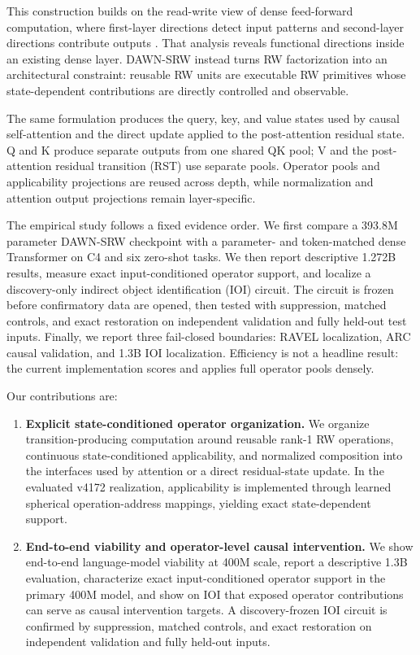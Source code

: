 \documentclass{article}
\newcommand{\DAWN}{DAWN-SRW}
\begin{document}
This construction builds on the read-write view of dense feed-forward
computation, where first-layer directions detect input patterns and second-layer
directions contribute outputs \cite{geva2021transformer}. That analysis reveals
functional directions inside an existing dense layer. \DAWN{} instead turns RW
factorization into an architectural constraint: reusable RW units are
executable RW primitives whose state-dependent contributions are
directly controlled and observable.

The same formulation produces the query, key, and value states used by causal
self-attention and the direct update applied to the post-attention residual
state.
Q and K produce separate outputs from one shared QK pool; V and the
post-attention residual transition (RST) use separate pools. Operator pools and
applicability projections are reused across depth, while normalization and
attention output projections remain layer-specific.

The empirical study follows a fixed evidence order. We first compare a 393.8M
parameter \DAWN{} checkpoint with a parameter- and token-matched dense
Transformer on C4 and six zero-shot tasks. We then report descriptive 1.272B
results, measure exact input-conditioned operator support, and localize a
discovery-only indirect object identification (IOI) circuit. The circuit is
frozen before confirmatory data are opened, then tested with suppression,
matched controls, and exact restoration on independent validation and fully
held-out test inputs. Finally, we report three fail-closed boundaries: RAVEL
localization, ARC causal validation, and 1.3B IOI localization. Efficiency is
not a headline result: the current implementation scores and applies full
operator pools densely.

Our contributions are:
\begin{enumerate}
    \item \textbf{Explicit state-conditioned operator organization.} We organize
    transition-producing computation around reusable rank-1 RW operations,
    continuous state-conditioned applicability, and normalized composition into
    the interfaces used by attention or a direct residual-state update. In the
    evaluated v4172 realization, applicability is implemented through learned
    spherical operation-address mappings, yielding exact state-dependent
    support.
    \item \textbf{End-to-end viability and operator-level causal intervention.} We show
    end-to-end language-model viability at 400M scale, report a descriptive
    1.3B evaluation, characterize exact input-conditioned operator support in
    the primary 400M model, and show on IOI that exposed operator contributions
    can serve as causal intervention targets. A discovery-frozen IOI circuit is
    confirmed by suppression, matched controls, and exact restoration on
    independent validation and fully held-out inputs.
\end{enumerate}
\end{document}
